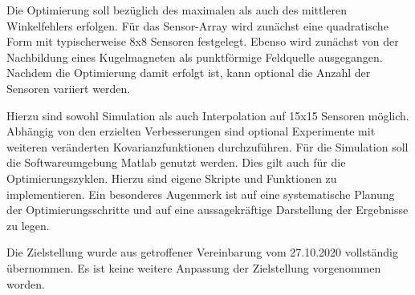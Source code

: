Die Optimierung soll bezüglich des maximalen als auch des mittleren Winkelfehlers erfolgen. Für das
Sensor-Array wird zunächst eine quadratische Form mit typischerweise 8x8 Sensoren festgelegt. Ebenso
wird zunächst von der Nachbildung eines Kugelmagneten als punktförmige Feldquelle ausgegangen.
Nachdem die Optimierung damit erfolgt ist, kann optional die Anzahl der Sensoren variiert werden.


\clearpage


Hierzu sind sowohl Simulation als auch Interpolation auf 15x15 Sensoren möglich. Abhängig von den
erzielten Verbesserungen sind optional Experimente mit weiteren veränderten Kovarianzfunktionen
durchzuführen.
Für die Simulation soll die Softwareumgebung Matlab genutzt werden. Dies gilt auch für die Optimierungszyklen. Hierzu sind eigene Skripte und Funktionen zu implementieren. Ein besonderes Augenmerk
ist auf eine systematische Planung der Optimierungsschritte und auf eine aussagekräftige Darstellung
der Ergebnisse zu legen.

Die Zielstellung wurde aus getroffener Vereinbarung vom 27.10.2020 vollständig übernommen. Es ist keine weitere Anpassung der Zielstellung vorgenommen worden.

